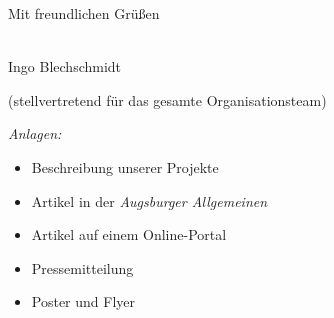 \documentclass{zirkelbrief}
\begin{document}
Mit freundlichen Grüßen

\ \\

Ingo Blechschmidt

\vspace{-0.2cm}

{\small (stellvertretend für das gesamte Organisationsteam)}


\vfill
\emph{Anlagen:}
\begin{itemize}
\setlength{\itemsep}{-0.3em}
\item Beschreibung unserer Projekte
\item Artikel in der \emph{Augsburger Allgemeinen}
\item Artikel auf einem Online-Portal
\item Pressemitteilung
\item Poster und Flyer
\end{itemize}
\end{document}
